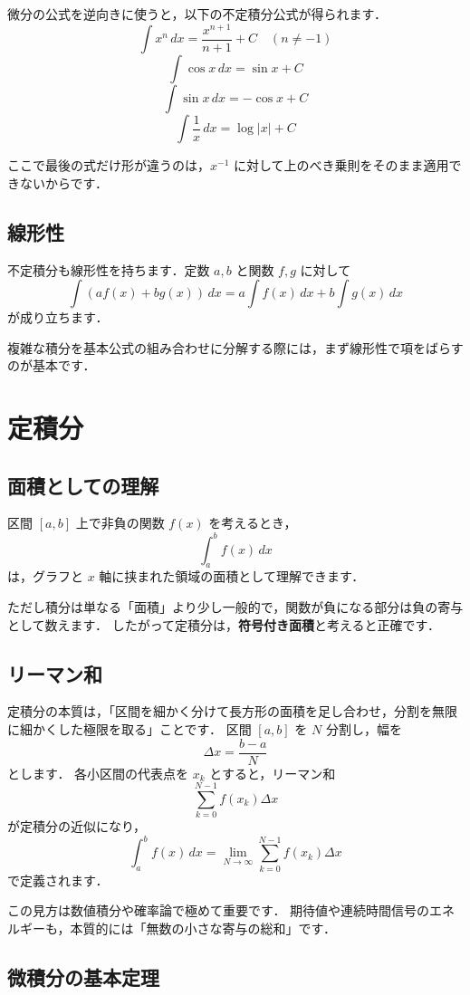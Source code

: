 微分の公式を逆向きに使うと，以下の不定積分公式が得られます．
\[
\int x^n\,dx = \frac{x^{n+1}}{n+1} + C \quad (n \neq -1)
\]
\[
\int \cos x\,dx = \sin x + C
\]
\[
\int \sin x\,dx = -\cos x + C
\]
\[
\int \frac{1}{x}\,dx = \log |x| + C
\]

ここで最後の式だけ形が違うのは，$x^{-1}$ に対して上のべき乗則をそのまま適用できないからです．

\subsection{線形性}

不定積分も線形性を持ちます．定数 $a, b$ と関数 $f, g$ に対して
\[
\int \left(af(x) + bg(x)\right)\,dx
= a\int f(x)\,dx + b\int g(x)\,dx
\]
が成り立ちます．

複雑な積分を基本公式の組み合わせに分解する際には，まず線形性で項をばらすのが基本です．


\section{定積分}

\subsection{面積としての理解}

区間 $[a,b]$ 上で非負の関数 $f(x)$ を考えるとき，
\[
\int_a^b f(x)\,dx
\]
は，グラフと $x$ 軸に挟まれた領域の面積として理解できます．

ただし積分は単なる「面積」より少し一般的で，関数が負になる部分は負の寄与として数えます．
したがって定積分は，\textbf{符号付き面積}と考えると正確です．

\subsection{リーマン和}

定積分の本質は，「区間を細かく分けて長方形の面積を足し合わせ，分割を無限に細かくした極限を取る」ことです．
区間 $[a,b]$ を $N$ 分割し，幅を
\[
\Delta x = \frac{b-a}{N}
\]
とします．
各小区間の代表点を $x_k$ とすると，リーマン和
\[
\sum_{k=0}^{N-1} f(x_k)\Delta x
\]
が定積分の近似になり，
\[
\int_a^b f(x)\,dx
= \lim_{N\to\infty}\sum_{k=0}^{N-1} f(x_k)\Delta x
\]
で定義されます．

この見方は数値積分や確率論で極めて重要です．
期待値や連続時間信号のエネルギーも，本質的には「無数の小さな寄与の総和」です．

\subsection{微積分の基本定理}

